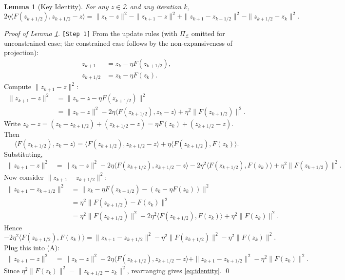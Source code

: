 \documentclass{article}
\theoremstyle{plain}
\newtheorem{lemma}{Lemma}
\theoremstyle{definition}
\begin{document}
\begin{lemma}[Key Identity] \label{lem:identity}
For any $z \in \mathcal{Z}$ and any iteration $k$,
\begin{equation} \label{eq:identity}
2\eta \langle F(z_{k+1/2}), z_{k+1/2} - z \rangle = \|z_k - z\|^2 - \|z_{k+1} - z\|^2 + \|z_{k+1} - z_{k+1/2}\|^2 - \|z_{k+1/2} - z_k\|^2.
\end{equation}
\end{lemma}
\begin{proof}[Proof of Lemma \ref{lem:identity}] \texttt{[Step 1]}
From the update rules (with $\Pi_{\mathcal{Z}}$ omitted for unconstrained case; the constrained case follows by the non-expansiveness of projection):
\begin{align*}
z_{k+1} &= z_k - \eta F(z_{k+1/2}), \\
z_{k+1/2} &= z_k - \eta F(z_k).
\end{align*}
Compute $\|z_{k+1} - z\|^2$:
\begin{align*}
\|z_{k+1} - z\|^2 &= \|z_k - z - \eta F(z_{k+1/2})\|^2 \\
&= \|z_k - z\|^2 - 2\eta \langle F(z_{k+1/2}), z_k - z \rangle + \eta^2 \|F(z_{k+1/2})\|^2.
\end{align*}
Write $z_k - z = (z_k - z_{k+1/2}) + (z_{k+1/2} - z) = \eta F(z_k) + (z_{k+1/2} - z)$. Then
\[
\langle F(z_{k+1/2}), z_k - z \rangle = \langle F(z_{k+1/2}), z_{k+1/2} - z \rangle + \eta \langle F(z_{k+1/2}), F(z_k) \rangle.
\]
Substituting,
\begin{align*}
\|z_{k+1} - z\|^2 &= \|z_k - z\|^2 - 2\eta \langle F(z_{k+1/2}), z_{k+1/2} - z \rangle - 2\eta^2 \langle F(z_{k+1/2}), F(z_k) \rangle + \eta^2 \|F(z_{k+1/2})\|^2. \tag{A}
\end{align*}
Now consider $\|z_{k+1} - z_{k+1/2}\|^2$:
\begin{align*}
\|z_{k+1} - z_{k+1/2}\|^2 &= \|z_k - \eta F(z_{k+1/2}) - (z_k - \eta F(z_k))\|^2 \\
&= \eta^2 \|F(z_{k+1/2}) - F(z_k)\|^2 \\
&= \eta^2 \|F(z_{k+1/2})\|^2 - 2\eta^2 \langle F(z_{k+1/2}), F(z_k) \rangle + \eta^2 \|F(z_k)\|^2.
\end{align*}
Hence
\[
-2\eta^2 \langle F(z_{k+1/2}), F(z_k) \rangle = \|z_{k+1} - z_{k+1/2}\|^2 - \eta^2 \|F(z_{k+1/2})\|^2 - \eta^2 \|F(z_k)\|^2.
\]
Plug this into (A):
\begin{align*}
\|z_{k+1} - z\|^2 &= \|z_k - z\|^2 - 2\eta \langle F(z_{k+1/2}), z_{k+1/2} - z \rangle + \|z_{k+1} - z_{k+1/2}\|^2 - \eta^2 \|F(z_k)\|^2.
\end{align*}
Since $\eta^2 \|F(z_k)\|^2 = \|z_{k+1/2} - z_k\|^2$, rearranging gives \eqref{eq:identity}. \qed
\end{proof}
\end{document}
